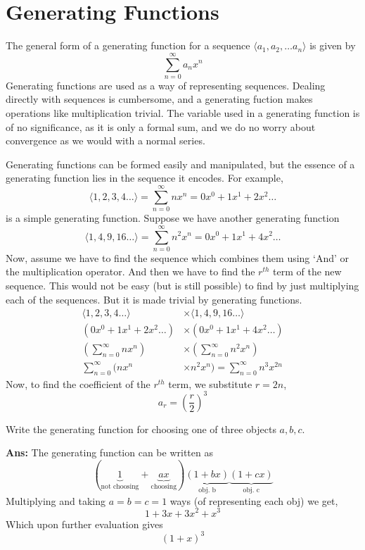 \chapter{Generating Functions}
The general form of a generating function for a sequence \mbox{$\langle a_1, a_2, \dots a_n\rangle$} is given by 
\[
    \sum_{n=0}^{\infty}a_n x^n
\]
Generating functions are used as a way of representing sequences. Dealing directly with sequences is cumbersome, and a generating fuction makes operations like multiplication trivial. The variable used in a generating function is of no significance, as it is only a formal sum, and we do no worry about convergence as we would with a normal series.

Generating functions can be formed easily and manipulated, but the essence of a generating function lies in the sequence it encodes. For example, 
\[
    \langle1,2,3,4\dots\rangle = \sum_{n=0}^{\infty} nx^n = 0x^0 + 1x^1 + 2x^2 \dots
\]
is a simple generating function. Suppose we have another generating function
\[
    \langle1,4,9,16 \dots\rangle =  \sum_{n=0}^{\infty} n^2x^n = 0x^0 + 1x^1 + 4x^2 \dots
\]
Now, assume we have to find the sequence which combines them using `And' or the multiplication operator. And then we have to find the \mbox{$r^{th}$} term of the new sequence. This would not be easy (but is still possible) to find by just multiplying each of the sequences. But it is made trivial by generating functions.
\begin{align*}
    \langle1,2,3,4\dots\rangle &\times \langle1,4,9,16 \dots\rangle\\
    (0x^0 + 1x^1 + 2x^2 \dots) &\times (0x^0 + 1x^1 + 4x^2 \dots)\\
    (\sum_{n=0}^{\infty} nx^n) &\times (\sum_{n=0}^{\infty} n^2x^n)\\
    \sum_{n=0}^{\infty} (nx^n &\times n^2 x^n)
    = \sum_{n=0}^{\infty} n^3 x^{2n}
\end{align*}
Now, to find the coefficient of the \mbox{$r^{th}$} term, we substitute \mbox{$r = 2n$},
\[
    a_r = \left(\frac{r}{2}\right)^3
\]

\begin{example}
    Write the generating function for choosing one of three objects \mbox{$a,b,c$}.

    \textbf{Ans:} The generating function can be written as 
    \[
        (\underbrace{1}_{\text{not choosing}}+\underbrace{ax}_{\text{choosing}})\underbrace{(1+bx)}_{\text{obj. b}}\underbrace{(1+cx)}_{\text{obj. c}}
    \]
    Multiplying and taking \mbox{$a=b=c=1$} ways (of representing each obj) we get,
    \[
        1+3x+3x^2+x^3
    \]
    Which upon further evaluation gives
    \[
        (1+x)^3
    \]
\end{example}

